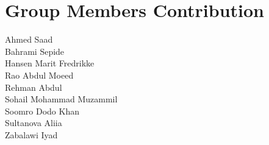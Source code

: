\section{Group Members Contribution}


\begin{description}
	\item[Ahmed Saad] 
	\item[Bahrami Sepide] 
	\item[Hansen Marit Fredrikke] 
	\item[Rao Abdul Moeed] 
	\item[Rehman Abdul] 
	\item[Sohail Mohammad Muzammil] 
	\item[Soomro Dodo Khan] 
	\item[Sultanova Aliia] 
	\item[Zabalawi Iyad] 
\end{description}

